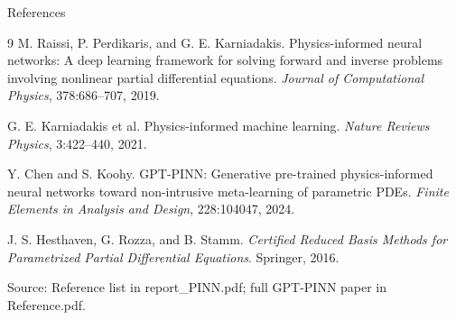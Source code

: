 \documentclass[aspectratio=169,xcolor=dvipsnames,11pt]{beamer}
\newcommand{\src}[1]{%
  \vfill
  {\color{MidGray}\fontsize{6.5}{7.5}\selectfont Source: #1\par}
}
\begin{document}
\begin{frame}{References}
  \footnotesize
  \begin{thebibliography}{9}
      M. Raissi, P. Perdikaris, and G. E. Karniadakis.
      \newblock Physics-informed neural networks: A deep learning framework for solving forward and inverse problems involving nonlinear partial differential equations.
      \newblock \emph{Journal of Computational Physics}, 378:686--707, 2019.

      G. E. Karniadakis et al.
      \newblock Physics-informed machine learning.
      \newblock \emph{Nature Reviews Physics}, 3:422--440, 2021.

      Y. Chen and S. Koohy.
      \newblock GPT-PINN: Generative pre-trained physics-informed neural networks toward non-intrusive meta-learning of parametric PDEs.
      \newblock \emph{Finite Elements in Analysis and Design}, 228:104047, 2024.

      J. S. Hesthaven, G. Rozza, and B. Stamm.
      \newblock \emph{Certified Reduced Basis Methods for Parametrized Partial Differential Equations}.
      \newblock Springer, 2016.
  \end{thebibliography}
  \src{Reference list in report\_PINN.pdf; full GPT-PINN paper in Reference.pdf.}
\end{frame}
\end{document}
